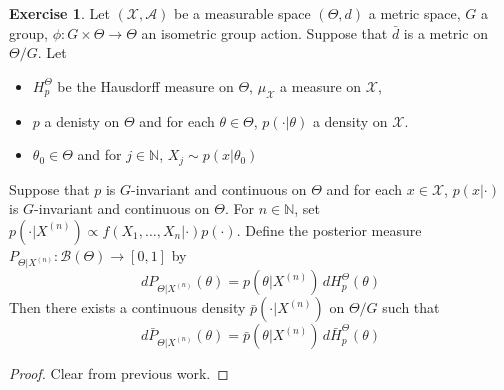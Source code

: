 \documentclass[12pt]{amsart}
\theoremstyle{definition}
\newtheorem{ex}[definition]{Exercise}
\newcommand{\N}{\mathbb{N}}
\newcommand{\MA}{\mathcal{A}}
\newcommand{\MB}{\mathcal{B}}
\newcommand{\MX}{\mathcal{X}}
\begin{document}
	\begin{ex}
	Let $(\MX, \MA)$ be a measurable space $(\Theta, d)$ a metric space, $G$ a group, $\phi: G \times \Theta \rightarrow \Theta$ an isometric group action. Suppose that $\bar{d}$ is a metric on $\Theta / G$. Let 
	\begin{itemize}
	\item $H_p^{\Theta}$ be the Hausdorff measure on $\Theta$, $\mu_{\MX}$ a measure on $\MX$, 
	\item $p$ a denisty on $\Theta$ and for each $\theta \in \Theta$, $p(\cdot|\theta)$ a density on $\MX$. 
	\item $\theta_0 \in \Theta$ and for $j \in \N$, $X_j \sim p(x|\theta_0)$
	\end{itemize}
	Suppose that $p$ is $G$-invariant and continuous on $\Theta$ and for each $x \in \MX$, $p(x| \cdot)$ is $G$-invariant and continuous on $\Theta$. For $n \in \N$, set $p(\cdot|X^{(n)}) \propto f(X_1, \ldots, X_n| \cdot) p(\cdot)$. Define the posterior measure $P_{\Theta|X^{(n)}}: \MB(\Theta) \rightarrow [0, 1]$ by 
	\begin{equation*}
	d P_{\Theta|X^{(n)}} (\theta) = p(\theta |X^{(n)}) \, dH_p^{\Theta} (\theta)
	\end{equation*}
	Then there exists a continuous density $\bar{p}(\cdot|X^{(n)})$ on $\Theta / G$ such that 
	\begin{equation*}
	d \bar{P}_{\Theta|X^{(n)}}(\theta) = \bar{p}(\theta |X^{(n)}) \, d\bar{H}_p^{\Theta} (\theta)
	\end{equation*}
	\end{ex}
	
	\begin{proof}
	Clear from previous work.
	\end{proof}
	
\end{document}
